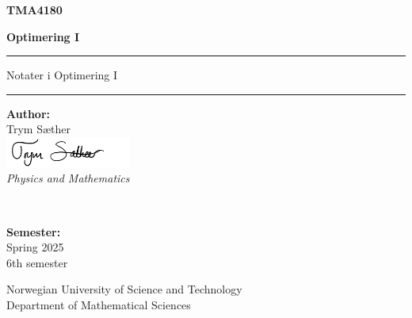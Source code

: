 \begin{titlepage}
    \newcommand{\HRule}{\rule{\linewidth}{0.5mm}}
    
    \center
    
    \vspace*{5cm}
    
    {\color{ntnu-blue}\sffamily\huge\bfseries TMA4180 \par}
    \vspace{0.5cm}
    {\sffamily\Huge\bfseries Optimering I \par}
    
    \vspace{1.5cm}
    
    \HRule
    \vspace{0.5cm}
    
    {\Large\sffamily Notater i Optimering I \par}
    
    \vspace{0.5cm}
    \HRule
    
    \vspace{2cm}
    
    \begin{minipage}{0.4\textwidth}
        \begin{flushleft}
            \large
            \textbf{Author:}\\
            Trym Sæther\\
            \vspace{0.3cm}
            \includegraphics[height=1cm]{frontmatter/signature.png}\\
            \vspace{0.3cm}
            \textit{Physics and Mathematics}
        \end{flushleft}
    \end{minipage}
    ~
    \begin{minipage}{0.4\textwidth}
        \begin{flushright}
            \large
            \textbf{Semester:}\\
            Spring 2025\\
            6th semester
        \end{flushright}
    \end{minipage}
    
    \vfill
    
    \begin{center}
        {\color{ntnu-blue}\sffamily\Large Norwegian University of Science and Technology}\\
        \vspace{0.3cm}
        {\sffamily\large Department of Mathematical Sciences}
    \end{center}
    
    \vspace{1cm} 
\end{titlepage}
